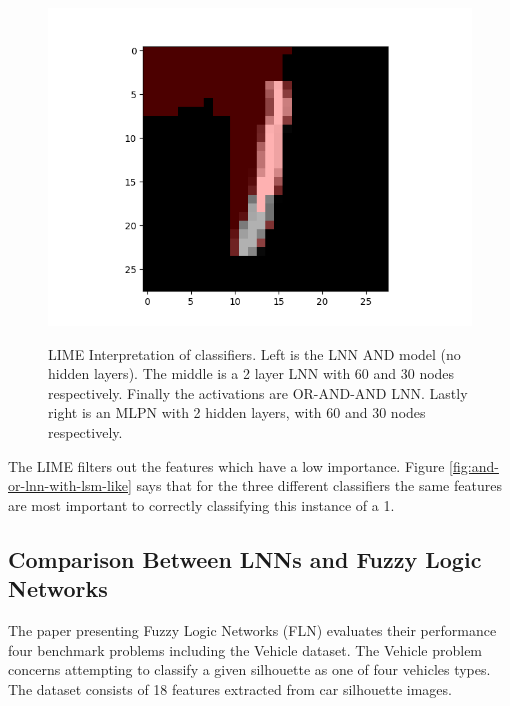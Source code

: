 \begin{figure}[H]
\begin{minipage}[b]{0.33\textwidth}
		\includegraphics[width=\textwidth]{LIME/MLPN.png}
		\label{}
	\end{minipage}
	\caption{LIME Interpretation of classifiers. Left is the LNN AND model (no hidden layers). The middle is a 2 layer LNN with 60 and 30 nodes respectively. Finally the activations are OR-AND-AND LNN. Lastly right is an MLPN with 2 hidden layers, with 60 and 30 nodes respectively.}
	\label{fig:lime-comp}
\end{figure}

The LIME filters out the features which have a low importance. Figure \ref{fig:and-or-lnn-with-lsm-like} says that for the three different classifiers the same features are most important to correctly classifying this instance of a 1. 

\subsection{Comparison Between LNNs and Fuzzy Logic Networks}
The paper presenting Fuzzy Logic Networks (FLN) evaluates their performance four benchmark problems including the Vehicle \cite{Lichman:2013} dataset. The Vehicle problem concerns attempting to classify a given silhouette as one of four vehicles types. The dataset consists of 18 features extracted from car silhouette images.\\

